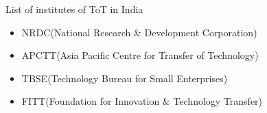 \begin{frame}{List of institutes of ToT in India}
\begin{itemize}
	\item NRDC(National Research \& Development Corporation)
	\item APCTT(Asia Pacific Centre for Transfer of Technology)
	\item TBSE(Technology Bureau for Small Enterprises)
	\item FITT(Foundation for Innovation \& Technology Transfer)
\end{itemize}
\end{frame}
